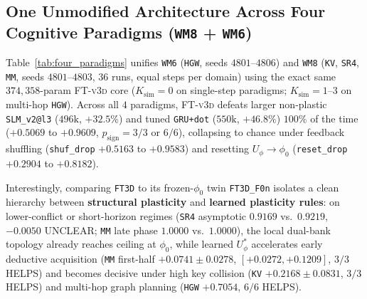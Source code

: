 \documentclass[11pt]{article}
\newcommand{\Uphi}{U_\phi}
\newcommand{\Ksim}{K_{\mathrm{sim}}}
\newcommand{\ftd}{\textsc{FT-v3d}}
\begin{document}
\subsection{One Unmodified Architecture Across Four Cognitive Paradigms (\texttt{WM8} + \texttt{WM6})}
\label{sec:wm8}

Table~\ref{tab:four_paradigms} unifies \texttt{WM6} (\texttt{HGW}, seeds $4801\text{--}4806$) and \texttt{WM8} (\texttt{KV}, \texttt{SR4}, \texttt{MM}, seeds $4801\text{--}4803$, $36$ runs, equal steps per domain) using the exact same $374{,}358$-param \ftd{} core ($\Ksim=0$ on single-step paradigms; $\Ksim=1\text{--}3$ on multi-hop \texttt{HGW}). Across all $4$ paradigms, \ftd{} defeats larger non-plastic \texttt{SLM\_v2@l3} ($496\text{k}$, $+32.5\%$) and tuned \texttt{GRU+dot} ($550\text{k}$, $+46.8\%$) $100\%$ of the time ($+0.5069$ to $+0.9609$, $p_{\text{sign}} = 3/3$ or $6/6$), collapsing to chance under feedback shuffling (\texttt{shuf\_drop} $+0.5163$ to $+0.9583$) and resetting $\Uphi \to \phi_0$ (\texttt{reset\_drop} $+0.2904$ to $+0.8182$).

Interestingly, comparing \texttt{FT3D} to its frozen-$\phi_0$ twin \texttt{FT3D\_F0n} isolates a clean hierarchy between \textbf{structural plasticity} and \textbf{learned plasticity rules}: on lower-conflict or short-horizon regimes (\texttt{SR4} asymptotic $0.9169$ vs.\ $0.9219$, $-0.0050$ \textsc{UNCLEAR}; \texttt{MM} late phase $1.0000$ vs.\ $1.0000$), the local dual-bank topology already reaches ceiling at $\phi_0$, while learned $\Uphi^*$ accelerates early deductive acquisition (\texttt{MM} first-half $+0.0741 \pm 0.0278$, $[+0.0272,+0.1209]$, $3/3$ HELPS) and becomes decisive under high key collision (\texttt{KV} $+0.2168 \pm 0.0831$, $3/3$ HELPS) and multi-hop graph planning (\texttt{HGW} $+0.7054$, $6/6$ HELPS).
\end{document}
